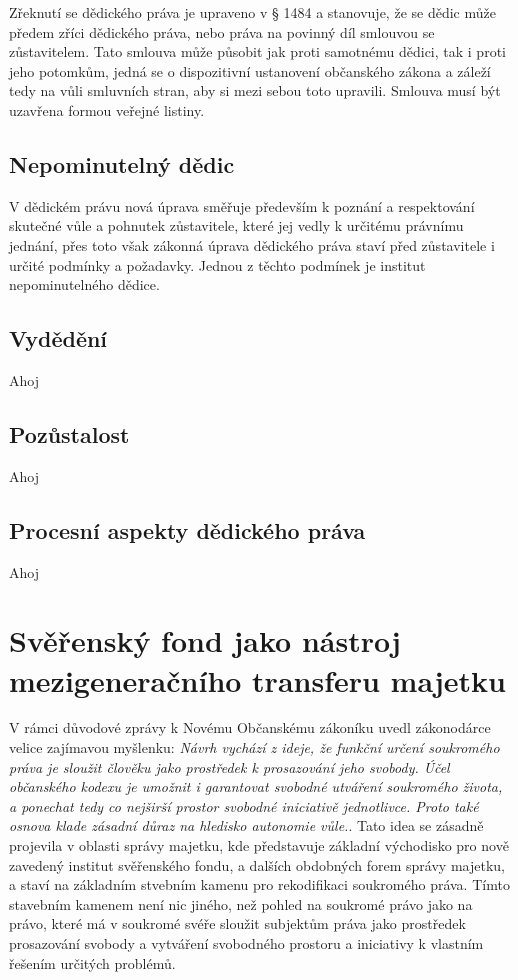 \documentclass{article}
\begin{document}
Zřeknutí se dědického práva je upraveno v § 1484 a stanovuje, že se dědic může předem zříci dědického práva, nebo práva na povinný díl smlouvou se zůstavitelem. Tato smlouva může působit jak proti samotnému dědici, tak i proti jeho potomkům, jedná se o dispozitivní ustanovení občanského zákona a záleží tedy na vůli smluvních stran, aby si mezi sebou toto upravili. Smlouva musí být uzavřena formou veřejné listiny. \\

\subsection{Nepominutelný dědic}

V dědickém právu nová úprava směřuje především k poznání a respektování skutečné vůle a pohnutek zůstavitele, které jej vedly k určitému právnímu jednání, přes toto však zákonná úprava dědického práva staví před zůstavitele i určité podmínky a požadavky. Jednou z těchto podmínek je institut nepominutelného dědice.

\subsection{Vydědění}
Ahoj
\subsection{Pozůstalost}
Ahoj
\subsection{Procesní aspekty dědického práva}
Ahoj

\newpage
\thispagestyle{smallertextinheader}

\section{Svěřenský fond jako nástroj mezigeneračního transferu majetku}

V rámci důvodové zprávy k Novému Občanskému zákoníku uvedl zákonodárce velice zajímavou myšlenku: \textit{Návrh vychází z ideje, že funkční určení soukromého práva je sloužit člověku jako prostředek k prosazování jeho svobody. Účel občanského kodexu je umožnit i garantovat svobodné utváření soukromého života, a ponechat tedy co nejširší prostor svobodné iniciativě jednotlivce. Proto také osnova klade zásadní důraz na hledisko autonomie vůle.}. Tato idea se zásadně projevila v oblasti správy majetku, kde představuje základní východisko pro nově zavedený institut svěřenského fondu, a dalších obdobných forem správy majetku, a staví na základním stvebním kamenu pro rekodifikaci soukromého práva. Tímto stavebním kamenem není nic jiného, než pohled na soukromé právo jako na právo, které má v soukromé svéře sloužit subjektům práva jako prostředek prosazování svobody a vytváření svobodného prostoru a iniciativy k vlastním řešením určitých problémů.\\
\end{document}
